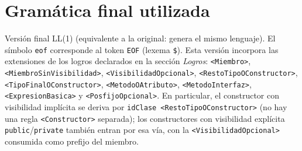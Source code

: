 \documentclass[11pt,a4paper]{article}
\begin{document}
\section{Gramática final utilizada}
\label{sec:gramatica}

Versión final LL(1) (equivalente a la original: genera el mismo lenguaje). El símbolo
\texttt{eof} corresponde al token \texttt{EOF} (lexema \verb!$!). Esta versión incorpora
las extensiones de los logros declarados en la sección \textit{Logros}: \texttt{<Miembro>},
\texttt{<MiembroSinVisibilidad>}, \texttt{<VisibilidadOpcional>},
\texttt{<RestoTipoOConstructor>}, \texttt{<TipoFinalOConstructor>},
\texttt{<MetodoOAtributo>}, \texttt{<MetodoInterfaz>}, \texttt{<ExpresionBasica>} y
\texttt{<PosfijoOpcional>}. En particular, el constructor con visibilidad implícita se
deriva por \texttt{idClase <RestoTipoOConstructor>} (no hay una regla
\texttt{<Constructor>} separada); los constructores con visibilidad explícita
\texttt{public}/\texttt{private} también entran por esa vía, con la
\texttt{<VisibilidadOpcional>} consumida como prefijo del miembro.
\end{document}
